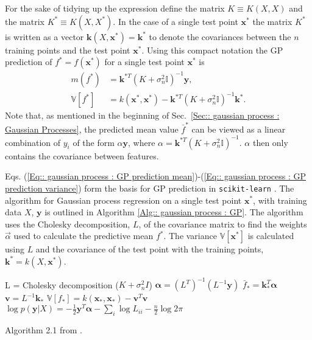 \documentclass[twoside,english]{uiofysmaster}
\begin{document}
For the sake of tidying up the expression define the matrix $K \equiv K(X, X)$ and the matrix $K^* \equiv K(X, X^*)$. In the case of a single test point $\textbf{x}^*$ the matrix $K^*$ is written as a vector $\textbf{k}(X, \textbf{x}^*) = \textbf{k}^*$ to denote the covariances between the $n$ training points and the test point $\textbf{x}^*$. Using this compact notation the GP prediction of $f^*=f(\textbf{x}^*)$ for a single test point $\textbf{x}^*$ is
\begin{align}
m(f^*) &= \textbf{k}^{*T}(K + \sigma_n^2\mathbb{I})^{-1} \textbf{y},\label{Eq:: gaussian process : GP prediction mean}\\
\mathbb{V}[f^*] &= k(\textbf{x}^*, \textbf{x}^*) - \textbf{k}^{*T}(K + \sigma_n^2 \mathbb{I})^{-1} \textbf{k}^*\label{Eq:: gaussian process : GP prediction variance}.
\end{align}
Note that, as mentioned in the beginning of Sec.~\ref{Sec:: gaussian process : Gaussian Processes}, the predicted mean value $\bar{f}^*$ can be viewed as a linear combination of $y_i$ of the form $\alpha \textbf{y}$, where $\alpha = \textbf{k}^{*T}(K + \sigma_n^2\mathbb{I})^{-1}$. $\alpha$ then only contains the covariance between features.

Eqs. (\ref{Eq:: gaussian process : GP prediction mean})-(\ref{Eq:: gaussian process : GP prediction variance}) form the basis for GP prediction in \verb|scikit-learn|  \cite{scikit-learn}. The algorithm for Gaussian process regression on a single test point $\textbf{x}^*$, with training data $X$, $\textbf{y}$ is outlined in Algorithm \ref{Alg:: gaussian process : GP}. The algorithm uses the Cholesky decomposition, $L$, of the covariance matrix to find the weights $\vec{\alpha}$ used to calculate the predictive mean $f^*$. The variance $\mathbb{V}[\textbf{x}^*]$ is calculated using $L$ and the covariance of the test point with the training points, $\textbf{k}^* = k(X, \textbf{x}^*)$.

\begin{algorithm}
L = Cholesky decomposition ($K + \sigma_n^2 I$) \;
$\boldsymbol{\alpha} = (L^T)^{-1}(L^{-1} \textbf{y})$ \;
$\bar{f}_* = \textbf{k}_*^T \boldsymbol{\alpha}$ \;
$\textbf{v} = L^{-1} \textbf{k}_*$ \;
$\mathbb{V}[f_*] = k(\textbf{x}_*, \textbf{x}_*) - \textbf{v}^T \textbf{v}$ \;
$\log p(\textbf{y}|X) = - \frac{1}{2} \textbf{y}^T \boldsymbol{\alpha} - \sum_i \log L_{ii} - \frac{n}{2} \log 2 \pi$ \;
\caption{Algorithm 2.1 from \cite{rasmussen2006gaussian}.}
\label{Alg:: gaussian process : GP}
\end{algorithm}
\end{document}

